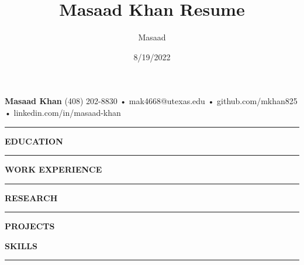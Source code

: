 \documentclass[12pt, a4paper]{article}
\title{Masaad Khan Resume}
\author{Masaad}
\date{8/19/2022}
\newcommand\jobDist{-2 mm}
\newcommand\titleheadersize{11}
\begin{document}
%
%
{\fontsize{20}{24}\selectfont \textbf{\hfil Masaad Khan \hfil}}\newline\vspace{-5mm}\newline
{\fontsize{\titleheadersize}{14}}\newline\vspace{-6mm}\newline
{\fontsize{\titleheadersize}{14}\selectfont \hspace*{0mm}\hfil (408) 202-8830 • mak4668@utexas.edu • github.com/mkhan825 • linkedin.com/in/masaad-khan \hfil}\newline\vspace{-9mm}\newline
%
%
\rule{19.5cm}{0.4pt}\vspace{-0.75mm}\newline
\noindent\textbf{{\fontsize{12}{14}\selectfont EDUCATION}}
\vspace{-1mm}\newline

\vspace{-1mm}
%
%
\noindent\rule{19.5cm}{0.4pt}
\noindent\textbf{{\fontsize{12}{14}\selectfont WORK EXPERIENCE}}
\vspace{-0.25mm}\newline
%
%

\vspace{\jobDist}

\vspace{\jobDist}

\vspace{-1mm}
%
%
\noindent\rule{19.5cm}{0.4pt}
\noindent\textbf{{\fontsize{12}{14}\selectfont RESEARCH}}\newline
\vspace{-5.5mm}\newline
%

\vspace{0cm}
%
%
\noindent\rule{19.5cm}{0.4pt}
\noindent\textbf{{\fontsize{12}{14}\selectfont PROJECTS}}\newline
\vspace{-0.8cm}\newline
%

\vspace{0cm}
%

\vspace{0cm}
%
%
\noindent\textbf{{\fontsize{12}{14}\selectfont SKILLS}}\newline
\vspace{-0.8cm}\newline
\rule{19.5cm}{0.4pt}
%
%

\vspace{0cm}
\end{document}

